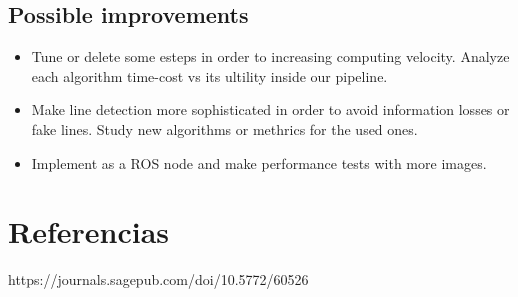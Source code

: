 \documentclass[12pt, a4paper]{article}
\begin{document}
\subsection{Possible improvements}


\begin{itemize}

    \item Tune or delete some esteps in order to increasing computing velocity. Analyze each algorithm time-cost vs its
    ultility inside our pipeline. 
    
    \item Make line detection more sophisticated in order to avoid information losses or fake lines. Study new algorithms or 
    methrics for the used ones. 
    
    \item Implement as a ROS node and make performance tests with more images.

\end{itemize}



\section{Referencias}

https://journals.sagepub.com/doi/10.5772/60526

\end{document}
